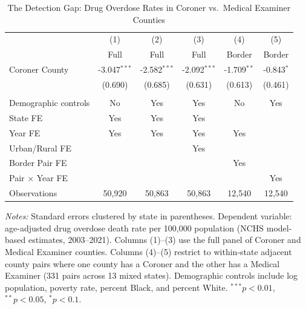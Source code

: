 \begin{table}[t]
\centering
\caption{The Detection Gap: Drug Overdose Rates in Coroner vs.\ Medical Examiner Counties}
\label{tab:main}
\small
\begin{tabular}{lccccc}
\hline\hline
 & (1) & (2) & (3) & (4) & (5) \\
 & Full & Full & Full & Border & Border \\
\hline
Coroner County & -3.047$^{***}$ & -2.582$^{***}$ & -2.092$^{***}$ & -1.709$^{**}$ & -0.843$^{*}$ \\
 & (0.690) & (0.685) & (0.631) & (0.613) & (0.461) \\
 & & & & & \\
Demographic controls & No & Yes & Yes & No & Yes \\
State FE & Yes & Yes & Yes & & \\
Year FE & Yes & Yes & Yes & Yes & \\
Urban/Rural FE & & & Yes & & \\
Border Pair FE & & & & Yes & \\
Pair $\times$ Year FE & & & & & Yes \\
Observations & 50,920 & 50,863 & 50,863 & 12,540 & 12,540 \\
\hline\hline
\end{tabular}
\begin{tablenotes}
\item \textit{Notes:} Standard errors clustered by state in parentheses. Dependent variable: age-adjusted drug overdose death rate per 100,000 population (NCHS model-based estimates, 2003--2021). Columns (1)--(3) use the full panel of Coroner and Medical Examiner counties. Columns (4)--(5) restrict to within-state adjacent county pairs where one county has a Coroner and the other has a Medical Examiner (331 pairs across 13 mixed states). Demographic controls include log population, poverty rate, percent Black, and percent White. $^{***}p<0.01$, $^{**}p<0.05$, $^{*}p<0.1$.
\end{tablenotes}
\end{table}
